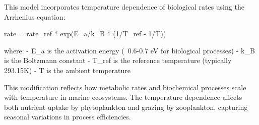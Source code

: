This model incorporates temperature dependence of biological rates using the Arrhenius equation:

rate = rate_ref * exp(E_a/k_B * (1/T_ref - 1/T))

where:
- E_a is the activation energy (~0.6-0.7 eV for biological processes)
- k_B is the Boltzmann constant
- T_ref is the reference temperature (typically 293.15K)
- T is the ambient temperature

This modification reflects how metabolic rates and biochemical processes scale with temperature in marine ecosystems. The temperature dependence affects both nutrient uptake by phytoplankton and grazing by zooplankton, capturing seasonal variations in process efficiencies.
